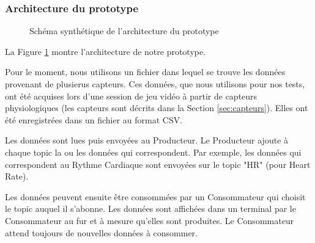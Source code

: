 \documentclass[11pt]{article}
\begin{document}
		\subsubsection{Architecture du prototype}\label{sec:protoarchi}
			\begin{figure}
				\centering
				\caption{Schéma synthétique de l'architecture du prototype}
				\label{fig:archiproto}
			\end{figure}
			La Figure \ref{fig:archiproto} montre l'architecture de notre prototype.\par
			Pour le moment, nous utilisons un fichier dans lequel se trouve les données provenant de plusierus capteurs.
			Ces données, que nous utilisons pour nos tests, ont été acquises lors d'une session de jeu vidéo à partir de capteurs physiologiques (les capteurs sont décrits dans la Section \ref{sec:capteurs}). 
			Elles ont été enregistrées dans un fichier au format CSV.\par
			Les données sont lues puis envoyées au Producteur.
			Le Producteur ajoute à chaque topic la ou les données qui correspondent.
			Par exemple, les données qui correspondent au Rythme Cardiaque sont envoyées sur le topic "HR" (pour Heart Rate).\par
			Les données peuvent ensuite être consommées par un Consommateur qui choisit le topic auquel il s'abonne.
			Les données sont affichées dans un terminal par le Consommateur au fur et à mesure qu'elles sont produites.
			Le Consommateur attend toujours de nouvelles données à consommer.
\end{document}
